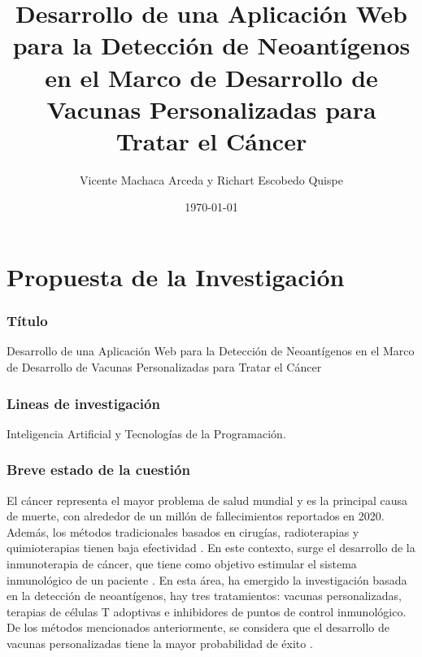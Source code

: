 \documentclass[a4paper]{article}
\title{Desarrollo de una Aplicación Web para la Detección de Neoantígenos en el Marco de Desarrollo de Vacunas Personalizadas para Tratar el Cáncer }
\author{Vicente Machaca Arceda y Richart  Escobedo Quispe}
\date{\today}
\begin{document}
	

	
	
	
	
	
	
	
	\maketitle

\part*{Propuesta de la Investigación}

\section{Título}

Desarrollo de una Aplicación Web para la Detección de Neoantígenos en el Marco de Desarrollo de Vacunas Personalizadas para Tratar el Cáncer

\section{Lineas de investigación}
Inteligencia Artificial y Tecnologías de la Programación.

 
	\section{Breve estado de la cuestión}
	
	El cáncer representa el mayor problema de salud mundial y es la principal causa de muerte, con alrededor de un millón de fallecimientos reportados en 2020. Además, los métodos tradicionales basados en cirugías, radioterapias y quimioterapias tienen baja efectividad \citep{peng2019neoantigen}. En este contexto, surge el desarrollo de la inmunoterapia de cáncer, que tiene como objetivo estimular el sistema inmunológico de un paciente \citep{borden2022cancer}. En esta área, ha emergido la investigación basada en la detección de neoantígenos, hay tres tratamientos: vacunas personalizadas, terapias de células T adoptivas e inhibidores de puntos de control inmunológico. De los métodos mencionados anteriormente, se considera que el desarrollo de vacunas personalizadas  tiene la mayor probabilidad de éxito \citep{borden2022cancer}.\\
\end{document}
